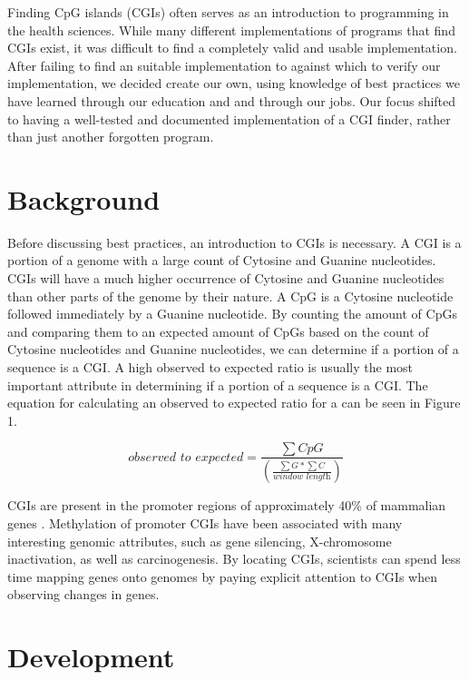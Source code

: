 \documentclass{bioinfo}
\begin{document}
Finding CpG islands (CGIs) often serves as an introduction to
programming in the health sciences. While many different
implementations of programs that find CGIs exist, it was difficult to
find a completely valid and usable implementation. After failing to
find an suitable implementation to against which to verify our
implementation, we decided create our own, using knowledge of best
practices we have learned through our education and and through our
jobs. Our focus shifted to having a well-tested and documented
implementation of a CGI finder, rather than just another forgotten
program.
    
\section{Background}

Before discussing best practices, an introduction to CGIs is
necessary. A CGI is a portion of a genome with a large count of
Cytosine and Guanine nucleotides. CGIs will have a much higher
occurrence of Cytosine and Guanine nucleotides than other parts of the
genome by their nature. A CpG is a Cytosine nucleotide followed
immediately by a Guanine nucleotide. By counting the amount of CpGs
and comparing them to an expected amount of CpGs based on the count of
Cytosine nucleotides and Guanine nucleotides, we can determine if a
portion of a sequence is a CGI. A high observed to expected ratio is
usually the most important attribute in determining if a portion of a
sequence is a CGI. The equation for calculating an observed to
expected ratio for a can be seen in Figure 1.

\begin{equation}
    \textit{observed to expected} = \frac{\sum CpG}{(\frac{\sum G * \sum C}{\textit{window length}})} \label{eq:01}
\end{equation}
      
CGIs are present in the promoter regions of approximately 40\% of
mammalian genes \citep{pmid11891299}. Methylation of promoter CGIs
have been associated with many interesting genomic attributes, such as
gene silencing, X-chromosome inactivation, as well as
carcinogenesis. By locating CGIs, scientists can spend less time
mapping genes onto genomes by paying explicit attention to CGIs when
observing changes in genes.

\section{Development}
\end{document}
